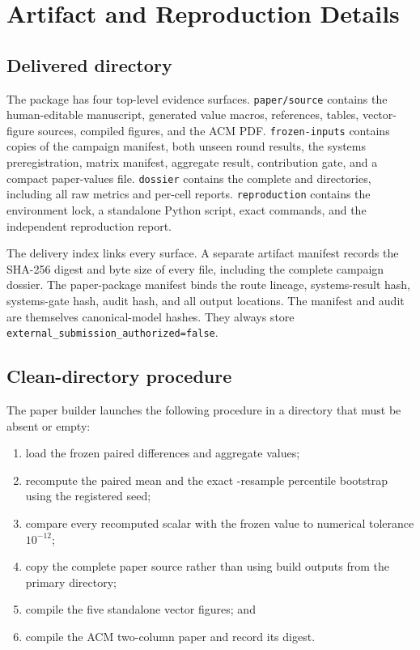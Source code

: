\section{Artifact and Reproduction Details}

\subsection{Delivered directory}

The package has four top-level evidence surfaces. \texttt{paper/source}
contains the human-editable manuscript, generated value macros, references,
tables, vector-figure sources, compiled figures, and the ACM PDF.
\texttt{frozen-inputs} contains copies of the campaign manifest, both unseen
round results, the systems preregistration, matrix manifest, aggregate result,
contribution gate, and a compact paper-values file.
\texttt{dossier} contains the complete \routea{} and \routeb{} directories,
including all raw metrics and per-cell reports. \texttt{reproduction}
contains the environment lock, a standalone Python script, exact commands,
and the independent reproduction report.

The delivery index links every surface. A separate artifact manifest records
the SHA-256 digest and byte size of every file, including the complete
campaign dossier. The paper-package manifest binds the route lineage,
systems-result hash, systems-gate hash, audit hash, and all output locations.
The manifest and audit are themselves canonical-model hashes. They always
store \texttt{external\_submission\_authorized=false}.

\subsection{Clean-directory procedure}

The paper builder launches the following procedure in a directory that must
be absent or empty:

\begin{enumerate}
  \item load the frozen paired differences and aggregate values;
  \item recompute the paired mean and the exact
  \BootstrapResamples{}-resample percentile bootstrap using the registered
  seed;
  \item compare every recomputed scalar with the frozen value to numerical
  tolerance \(10^{-12}\);
  \item copy the complete paper source rather than using build outputs from
  the primary directory;
  \item compile the five standalone vector figures; and
  \item compile the ACM two-column paper and record its digest.
\end{enumerate}

